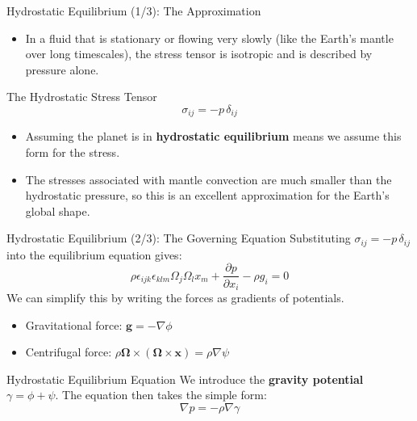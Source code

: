 \documentclass{beamer}
\begin{document}
\begin{frame}{Hydrostatic Equilibrium (1/3): The Approximation}
    \begin{itemize}
        \item In a fluid that is stationary or flowing very slowly (like the Earth's mantle over long timescales), the stress tensor is isotropic and is described by pressure alone.
    \end{itemize}
    \pause
    \begin{block}{The Hydrostatic Stress Tensor}
        $$ \sigma_{ij} = -p\,\delta_{ij} $$
    \end{block}
    \pause
    \begin{itemize}
        \item Assuming the planet is in \textbf{hydrostatic equilibrium} means we assume this form for the stress.
        \pause
        \item The stresses associated with mantle convection are much smaller than the hydrostatic pressure, so this is an excellent approximation for the Earth's global shape.
    \end{itemize}
\end{frame}

\begin{frame}{Hydrostatic Equilibrium (2/3): The Governing Equation}
    Substituting $\sigma_{ij} = -p\,\delta_{ij}$ into the equilibrium equation gives:
    $$ \rho\epsilon_{ijk}\epsilon_{klm}\Omega_{j}\Omega_{l}x_{m} + \frac{\partial p}{\partial x_{i}} - \rho g_{i} = 0 $$
    \pause
    We can simplify this by writing the forces as gradients of potentials.
    \begin{itemize}
        \item Gravitational force: $\mathbf{g} = -\nabla\phi$
        \item Centrifugal force: $\rho \boldsymbol{\Omega} \times (\boldsymbol{\Omega} \times \mathbf{x}) = \rho \nabla\psi$
    \end{itemize}
    \pause
    \begin{alertblock}{Hydrostatic Equilibrium Equation}
        We introduce the \textbf{gravity potential} $\gamma = \phi + \psi$. The equation then takes the simple form:
        $$ \nabla p = -\rho \nabla\gamma $$
    \end{alertblock}
\end{frame}
\end{document}
